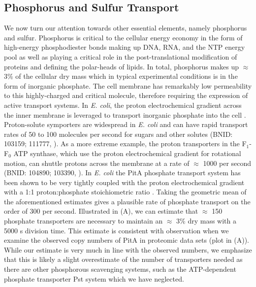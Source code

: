 \subsection{Phosphorus and Sulfur Transport}
We now turn our attention towards other essential elements, namely phosphorus and
sulfur. Phosphorus is critical to the cellular energy economy in the form of
high-energy phosphodiester bonds making up DNA, RNA, and the NTP energy pool as
well as playing a critical role in the post-translational modification of
proteins and defining the polar-heads of lipids. In total, phosphorus
makes up $\approx$3\% of the cellular dry mass which in typical experimental conditions is in the form of inorganic phosphate. The cell membrane
has remarkably low permeability to this highly-charged and critical molecule,
therefore requiring the expression of active transport systems. In \textit{E. coli}, the proton
electrochemical gradient across the inner membrane is leveraged to transport
inorganic phosphate into the cell \citep{rosenberg1977}.
Proton-solute symporters are widespread in \textit{E. coli} \citep{ramos1977,
booth1979} and can have rapid transport rates of 50 to 100 molecules per second for
sugars and other solutes (BNID: 103159; 111777, \cite{milo2010}). As a more
extreme example, the proton transporters in the F$_1$-F$_0$ ATP synthase, which
use the proton electrochemical gradient for rotational motion, can shuttle
protons across the membrane at a rate of $\approx$ 1000 per second (BNID:
104890; 103390, \citep{milo2010}). In \textit{E.
coli} the PitA phosphate transport system has been shown to be very tightly coupled
with the proton electrochemical gradient with a 1:1 proton:phosphate
stoichiometric ratio \citep{harris2001, feist2007}. Taking the geometric mean of
the aforementioned estimates gives a plausible rate of phosphate transport on
the order of 300  per second. Illustrated in
(A), we can estimate that $\approx$ 150
phosphate transporters are necessary to maintain an $\approx$ 3\% dry mass with
a 5000 s division time. This estimate is consistent with observation when we examine the
observed copy numbers of PitA in proteomic data sets (plot in
(A)). While our estimate is very much in line with the
observed numbers, we emphasize that this is likely a slight overestimate of the
number of transporters needed as there are other phosphorous scavenging systems,
such as the ATP-dependent phosphate transporter Pst system which we have neglected.

